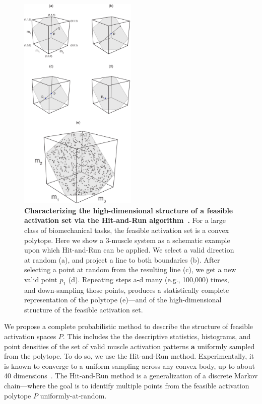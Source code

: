 \documentclass[9pt,twocolumn,twoside,lineno]{pnas-new}
\begin{document}
{\begin{figure}[htbp]
\centering
\includegraphics[width=0.5\textwidth]{numbered_figures/figure_2_hit_and_run_ALL_steps.pdf}
\caption{\textbf{Characterizing the high-dimensional structure of a feasible activation set via the Hit-and-Run algorithm~\cite{lovasz1999hit}.}  For a large class of biomechanical tasks, the feasible activation set is a convex polytope. Here we show a 3-muscle system as a schematic example upon which Hit-and-Run can be applied. We select a valid direction at random (a), and project a line to both boundaries (b). After selecting a point at random from the resulting line (c), we get a new valid point $p_1$ (d). Repeating steps a-d many (e.g., 100,000) times, and down-sampling those points, produces a statistically complete representation of the polytope (e)---and of the high-dimensional structure of the feasible activation set.}
\label{fig:figure_2_hit_and_run_steps}
\end{figure}


We propose a complete probabilistic method to describe the structure of feasible activation spaces $P$. This includes the the descriptive statistics, histograms, and point densities of the set of valid muscle activation patterns $\textbf{a}$ uniformly sampled from the polytope. To do so, we use the Hit-and-Run method. Experimentally, it is known to converge to a uniform sampling across any convex body, up to about 40 dimensions~\cite{smith1984efficient}. The Hit-and-Run method is a generalization of a discrete Markov chain---where the goal is to identify multiple points from the feasible activation polytope $P$ uniformly-at-random.

}
\end{document}
